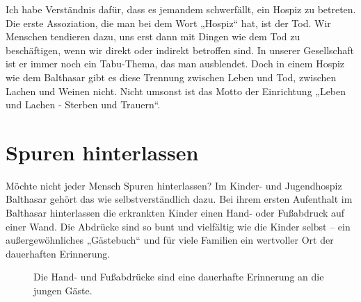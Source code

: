 \documentclass[fontsize=14pt,a4paper,headinclude,DIV=calc,automark]{scrbook}
\begin{document}
Ich habe Verständnis dafür, dass es jemandem schwerfällt, ein Hospiz zu betreten. Die erste Assoziation, die man bei dem Wort „Hospiz“ hat, ist der Tod. Wir Menschen tendieren dazu, uns erst dann mit Dingen wie dem Tod zu beschäftigen, wenn wir direkt oder indirekt betroffen sind. In unserer Gesellschaft ist er immer noch ein Tabu-Thema, das man ausblendet. Doch in einem Hospiz wie dem Balthasar gibt es diese Trennung zwischen Leben und Tod, zwischen Lachen und Weinen nicht. Nicht umsonst ist das Motto der Einrichtung „Leben und Lachen - Sterben und Trauern“.

\section{Spuren hinterlassen}

Möchte nicht jeder Mensch Spuren hinterlassen? Im Kinder- und Jugendhospiz Balthasar gehört das wie selbstverständlich dazu. Bei ihrem ersten Aufenthalt im Balthasar hinterlassen die erkrankten Kinder einen Hand- oder Fußabdruck auf einer Wand. Die Abdrücke sind so bunt und vielfältig wie die Kinder selbst – ein außergewöhnliches „Gästebuch“ und für viele Familien ein wertvoller Ort der dauerhaften Erinnerung.

\setlength{\fboxsep}{0pt}    %
\setlength{\fboxrule}{0.2pt} %
\begin{figure}[ht]
    \raggedright
    \caption{Die Hand- und Fußabdrücke sind eine dauerhafte Erinnerung an die jungen Gäste.}
    \label{fig:spuren_hinterlassen}
\end{figure}
\end{document}
